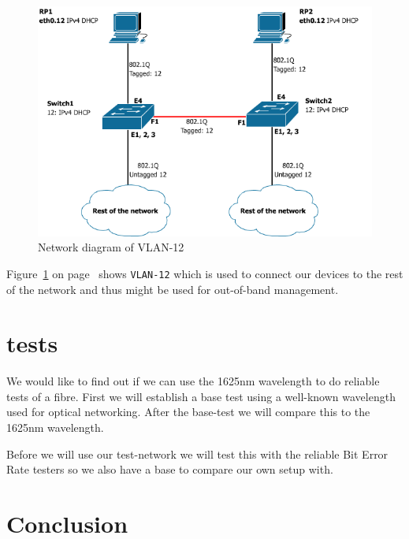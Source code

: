 \documentclass{article}
\begin{document}
\begin{figure}[h]
\centerline{\includegraphics[scale=0.4, trim = 0mm 0mm 0mm 0mm]{images/PoC_12.png}}
\caption{Network diagram of VLAN-12}
\label{fig:poc_12}
\end{figure}
Figure~\ref{fig:poc_12} on page~\pageref{fig:poc_12} shows \texttt{VLAN-12} which is used to connect our devices to the rest of the network and thus might be used for out-of-band management.

\newpage
\section{tests}
We would like to find out if we can use the 1625nm wavelength to do reliable tests of a fibre. First we will establish a base test using a well-known wavelength used for optical networking. After the base-test we will compare this to the 1625nm wavelength.

Before we will use our test-network we will test this with the reliable Bit Error Rate testers so we also have a base to compare our own setup with.





\newpage
\section{Conclusion}


\end{document}
